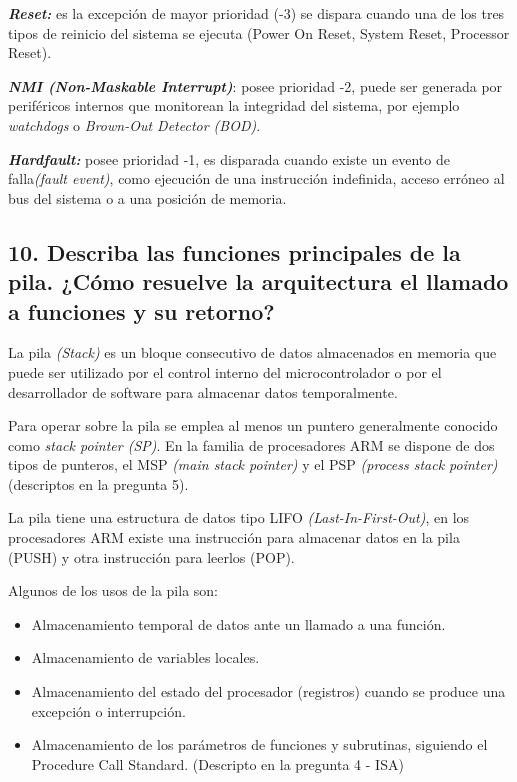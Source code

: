 \documentclass[10pt,a4paper,twoside,spanish]{article}	%
\begin{document}
  \textbf{\textit{Reset:}} es la excepción de mayor prioridad (-3) se dispara cuando una de los tres tipos de reinicio del sistema se ejecuta (Power On Reset, System Reset, Processor Reset). 
  
  \textbf{\textit{NMI (Non-Maskable Interrupt)}}: posee prioridad -2,  puede ser generada por periféricos internos que monitorean la integridad del sistema, por ejemplo \textit{watchdogs} o \textit{Brown-Out Detector (BOD)}.
  
  \textbf{\textit{Hardfault:}} posee prioridad -1, es disparada cuando existe un evento de falla\textit{(fault event)}, como ejecución de una instrucción indefinida, acceso erróneo al bus del sistema o a una posición de memoria. 

\subsection*{10. Describa las funciones principales de la pila. ¿Cómo resuelve la arquitectura el llamado a funciones y su retorno?}

La pila \textit{(Stack)}  es un bloque consecutivo de datos almacenados en memoria que puede ser utilizado por el control interno del microcontrolador o por el desarrollador de software para almacenar datos temporalmente. 

Para operar sobre la pila se emplea al menos un puntero generalmente conocido como \textit{stack pointer (SP)}. En la familia de procesadores ARM se dispone de dos tipos de punteros, el MSP \textit{(main stack pointer)} y el PSP \textit{(process stack pointer)}(descriptos en la pregunta 5).

La pila tiene una estructura de datos tipo LIFO \textit{(Last-In-First-Out)}, en los procesadores ARM existe una instrucción para almacenar datos en la pila (PUSH) y otra instrucción para leerlos (POP).

Algunos de los usos de la pila son:
\begin{itemize}
\item Almacenamiento temporal de datos ante un llamado a una función. 

\item Almacenamiento de variables locales.

\item Almacenamiento del estado del procesador (registros) cuando se produce una excepción o interrupción.

\item Almacenamiento de los parámetros de funciones y subrutinas, siguiendo el Procedure Call Standard. (Descripto en la pregunta 4 - ISA)
\end{itemize}
\end{document}
